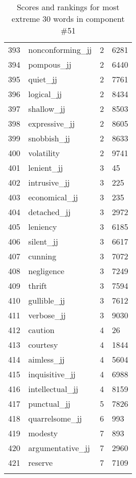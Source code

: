 \begin{longtable}[!htbp]{| rlr@{.}l |}
    393 & nonconforming\_jj & 2 & 6281 \\
    394 & pompous\_jj & 2 & 6440 \\
    395 & quiet\_jj & 2 & 7761 \\
    396 & logical\_jj & 2 & 8434 \\
    397 & shallow\_jj & 2 & 8503 \\
    398 & expressive\_jj & 2 & 8605 \\
    399 & snobbish\_jj & 2 & 8633 \\
    400 & volatility & 2 & 9741 \\
    401 & lenient\_jj & 3 & 45 \\
    402 & intrusive\_jj & 3 & 225 \\
    403 & economical\_jj & 3 & 235 \\
    404 & detached\_jj & 3 & 2972 \\
    405 & leniency & 3 & 6185 \\
    406 & silent\_jj & 3 & 6617 \\
    407 & cunning & 3 & 7072 \\
    408 & negligence & 3 & 7249 \\
    409 & thrift & 3 & 7594 \\
    410 & gullible\_jj & 3 & 7612 \\
    411 & verbose\_jj & 3 & 9030 \\
    412 & caution & 4 & 26 \\
    413 & courtesy & 4 & 1844 \\
    414 & aimless\_jj & 4 & 5604 \\
    415 & inquisitive\_jj & 4 & 6988 \\
    416 & intellectual\_jj & 4 & 8159 \\
    417 & punctual\_jj & 5 & 7826 \\
    418 & quarrelsome\_jj & 6 & 993 \\
    419 & modesty & 7 & 893 \\
    420 & argumentative\_jj & 7 & 2960 \\
    421 & reserve & 7 & 7109 \\
    \hline
    \caption{Scores and rankings for most extreme 30 words in component \#51} \\
\end{longtable}
